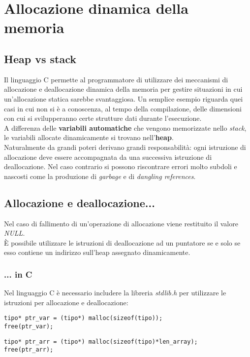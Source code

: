 \chapter{Allocazione dinamica della memoria}
\section{Heap vs stack}
Il linguaggio C permette al programmatore di utilizzare dei meccanismi di allocazione e deallocazione dinamica della memoria per gestire situazioni in cui un’allocazione statica sarebbe svantaggiosa. Un semplice esempio riguarda quei casi in cui non si è a conoscenza, al tempo della compilazione, delle dimensioni con cui si svilupperanno certe strutture dati durante l'esecuzione.\\
A differenza delle \textbf{variabili automatiche} che vengono memorizzate nello \textit{stack}, le variabili allocate dinamicamente si trovano nell'\textbf{heap}.\\
Naturalmente da grandi poteri derivano grandi responsabilità: ogni istruzione di allocazione deve essere accompagnata da una successiva istruzione di deallocazione. Nel caso contrario si possono riscontrare errori molto subdoli e nascosti come la produzione di \textit{garbage} e di \textit{dangling references}.

\section{Allocazione e deallocazione...}
Nel caso di fallimento di un'operazione di allocazione viene restituito il valore \textit{NULL}.\\
\`{E} possibile utilizzare le istruzioni di deallocazione ad un puntatore se e solo se esso contiene un indirizzo sull'heap assegnato dinamicamente.
\subsection{... in C}
Nel linguaggio C è necessario includere la libreria \textit{stdlib.h} per utilizzare le istruzioni per allocazione e deallocazione:
\begin{lstlisting}[title={Allocazione e deallocazione dinamica di una variabile in C}]
tipo* ptr_var = (tipo*) malloc(sizeof(tipo));
free(ptr_var);
\end{lstlisting}
\begin{lstlisting}[title={Allocazione e deallocazione dinamica di un vettore in C}]
tipo* ptr_arr = (tipo*) malloc(sizeof(tipo)*len_array);
free(ptr_arr);
\end{lstlisting}

